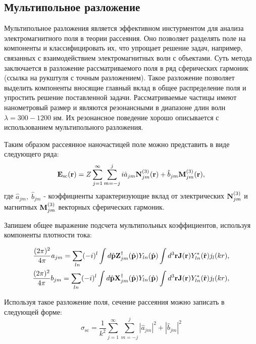 \subsection{Мультипольное разложение}\label{subsec:mult_decomp}

Мультипольное разложения является эффективном инстурментом для анализа электромагнитного поля в теории рассеяния. Оно позволяет разделять поле на компоненты и классифицировать их, что упрощает решение задач, например, связанных с взаимодействием электромагнитных волн с объектами. Суть метода заключается в разложение рассматриваемого поля в ряд сферических гармоник (ссылка на  рукштуля с точным разложением). Такое разложение позволяет выделить компоненты вносящие главный вклад в общее распределение поля и упростить решение поставленной задачи.
Рассматриваемые частицы имеют нанометровый размер и являются резонансными в диапазоне длин волн $\lambda = 300-1200$ нм. Их резонансное поведение хорошо описывается с использованием мультипольного разложения. 

Таким образом рассеянное наночастицей поле можно представить в виде следующего ряда:
\begin{equation}
    \vb{E}_{\text{sc}} (\vb{r}) = Z \sum_{j=1}^{\infty} \sum_{m=-j}^{j} i \hat{a}_{jm} \vb{N}_{jm}^{(3)}(\vb{r}) + \hat{b}_{jm} \vb{M}_{jm}^{(3)} (\vb{r}),\label{eq:multipolar_field}
\end{equation}
где $\hat{a}_{jm},\;\hat{b}_{jm}$ - коэффициенты характеризующие вклад от электрических $\vb{N}_{jm}^{(3)}$ и магнитных $\vb{M}_{jm}^{(3)}$ векторных сферических гармоник. 

Запишем общее выражение подсчета мультипольных коэффициентов, используя компоненты плотности тока:

\begin{align}
    \frac{(2\pi)^2}{4\pi} a_{jm} = \sum_{ln} (-i)^l \int d \hat{\vb{p}} \vb{Z}^{\dag}_{jm}(\hat{\vb{p}}) Y_{ln}(\hat{\vb{p}}) \int d^3 \vb{r} \vb{J}(\vb{r}) Y_{ln}^* (\hat{\vb{r}}) j_l(kr),\\
    \frac{(2\pi)^2}{4\pi} b_{jm} = \sum_{ln} (-i)^l \int d \hat{\vb{p}} \vb{X}^{\dag}_{jm}(\hat{\vb{p}}) Y_{ln}(\hat{\vb{p}}) \int d^3 \vb{r} \vb{J}(\vb{r}) Y_{ln}^* (\hat{\vb{r}}) j_l(kr),
\end{align}

Используя такое разложение поля, сечение рассеяния можно записать в следующей форме:
\begin{equation}
    \sigma_{\text{sc}} = \frac{1}{k^2} \sum_{j=1}^{\infty} \sum_{m=-j}^j |\hat{a}_{jm} |^2 + |\hat{b}_{jm}|^2 \label{eq:scat_sc}
\end{equation}

